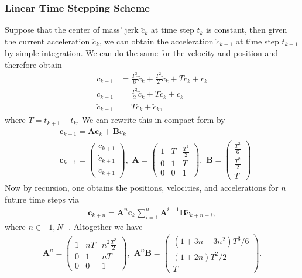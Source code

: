 \subsubsection{Linear Time Stepping Scheme}
Suppose that the center of mass' jerk $\dddot{c}_k$ at time step $t_k$ is constant, then given the current acceleration $\ddot{c}_k$, we can obtain the acceleration $\ddot{c}_{k+1}$ at time step $t_{k+1}$ by simple integration. We can do the same for the velocity and position and therefore obtain
\begin{align}
	c_{k+1} &= \frac{T^3}{6}\dddot{c}_k+\frac{T^2}{2}\ddot{c}_k+T\dot{c}_k+c_k\\
	\dot{c}_{k+1} &= \frac{T^2}{2}\dddot{c}_k+T\ddot{c}_k+\dot{c}_k\\
	\ddot{c}_{k+1} &= T\dddot{c}_{k} + \ddot{c}_k,
\end{align}
where $T = t_{k+1}-t_k$. We can rewrite this in compact form by
\begin{align}
	&\bm{c}_{k+1} = \bm{A}\bm{c}_k + \bm{B}\dddot{c}_k \\
	&\bm{c}_{k+1} = \begin{pmatrix}
	c_{k+1} \\
	\dot{c}_{k+1} \\
	\ddot{c}_{k+1}
	\end{pmatrix},\,\,
	\bm{A} = \begin{pmatrix}
	1 & T & \frac{T^2}{2} \\
	0 & 1 & T \\
	0 & 0 & 1
	\end{pmatrix},\,\,
	\bm{B} = \begin{pmatrix}
	\frac{T^3}{6} \\
	\frac{T^2}{2} \\
	T
	\end{pmatrix}
	\label{eq::212_ltss}
\end{align}
Now by recursion, one obtains the positions, velocities, and accelerations for $n$ future time steps via
\begin{align}
	\bm{c}_{k+n} = \bm{A}^n\bm{c}_k\sum_{i=1}^n \bm{A}^{i-1}\bm{B}\dddot{c}_{k+n-i},
	\label{eq::212_preview}
\end{align}
where $n\in[1,N]$. Altogether we have
\begin{align}
	\bm{A}^n = \begin{pmatrix}
	1 & nT & n^2\frac{T^2}{2} \\
	0 & 1 & nT \\
	0 & 0 & 1
	\end{pmatrix},\,\,
	\bm{A}^n\bm{B} = \begin{pmatrix}
	(1+3n+3n^2)T^3/6 \\
	(1+2n)T^2/2 \\
	T
	\end{pmatrix}.
	\label{eq::212_preview_mat}
\end{align}
